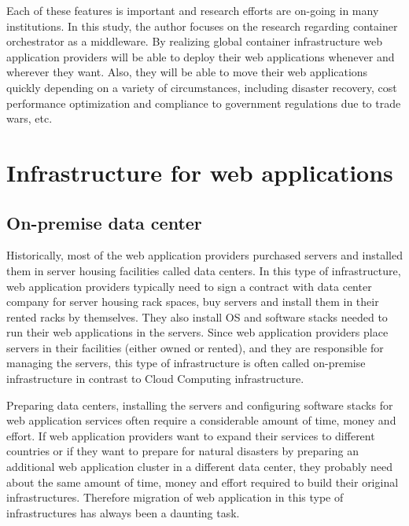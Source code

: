 Each of these features is important\added{,} and research efforts are on-going in many institutions.
In this study, the author focuses on the research regarding container orchestrator as a  middleware.
%
By realizing global container infrastructure  web application providers will be able to deploy their web applications whenever and wherever they want.
Also, they will be able to move their web applications quickly depending on a variety of circumstances, including disaster recovery, cost performance optimization\added{,} and compliance to government regulations due to trade wars, etc.


\section{Infrastructure for web applications}

\subsection{On-premise data center}

Historically, most of the web application providers purchased servers and installed them in server housing facilities called data centers.
In this type of infrastructure, web application providers typically need to sign a contract with data center company for server housing rack spaces, buy servers and install them in their rented racks by themselves.
They also install OS and software stacks needed to run their web applications in the servers.
Since web application providers place servers in their facilities (either owned or rented), and they are responsible for managing the servers, this type of infrastructure is often called on-premise infrastructure in contrast to Cloud Computing infrastructure.

Preparing data centers, installing the servers and configuring software stacks for web application services often require a considerable amount of time, money and effort.
If web application providers want to expand their services to different countries or if they want to prepare for natural disasters by preparing an additional web application cluster in a different data center, they probably need about the same amount of time, money and effort required to build their original infrastructures.
Therefore migration of web application in this type of infrastructures has always been a daunting task.

